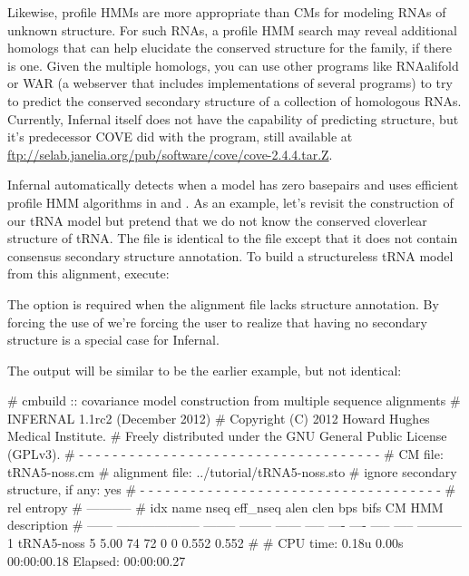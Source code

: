 Likewise, profile HMMs are more appropriate than CMs for modeling RNAs
of unknown structure. For such RNAs, a profile HMM search may reveal
additional homologs that can help elucidate the conserved structure
for the family, if there is one. Given the multiple homologs, you can
use other programs like RNAalifold \citep{Bernhart08,Hofacker02} or
WAR \citep{Torarinsson08b} (a webserver that includes implementations
of several programs) to try to predict the conserved secondary
structure of a collection of homologous RNAs. Currently, Infernal
itself does not have the capability of predicting structure, but it's
predecessor COVE did with the  program, still available at
\url{ftp://selab.janelia.org/pub/software/cove/cove-2.4.4.tar.Z}.

Infernal automatically detects when a model has zero basepairs and
uses efficient profile HMM algorithms in  and
. As an example, let's revisit the construction of our
tRNA model but pretend that we do not know the conserved cloverlear
structure of tRNA.
The file 
 is identical to the file 
 except that it does not contain consensus
secondary structure annotation. 
To build a structureless tRNA model from this alignment, execute:


The  option is required when the alignment file lacks
structure annotation. By forcing the use of  we're
forcing the user to realize that having no secondary structure is a
special case for Infernal.

The output will be similar to be the earlier example, but not
identical:

\begin{sreoutput}
# cmbuild :: covariance model construction from multiple sequence alignments
# INFERNAL 1.1rc2 (December 2012)
# Copyright (C) 2012 Howard Hughes Medical Institute.
# Freely distributed under the GNU General Public License (GPLv3).
# - - - - - - - - - - - - - - - - - - - - - - - - - - - - - - - - - - - -
# CM file:                                            tRNA5-noss.cm
# alignment file:                                     ../tutorial/tRNA5-noss.sto
# ignore secondary structure, if any:                 yes
# - - - - - - - - - - - - - - - - - - - - - - - - - - - - - - - - - - - -
#                                                                      rel entropy
#                                                                      -----------
# idx    name                     nseq eff_nseq   alen  clen  bps bifs    CM   HMM description
# ------ -------------------- -------- -------- ------ ----- ---- ---- ----- ----- -----------
       1 tRNA5-noss                  5     5.00     74    72    0    0 0.552 0.552 
#
# CPU time: 0.18u 0.00s 00:00:00.18 Elapsed: 00:00:00.27
\end{sreoutput}

